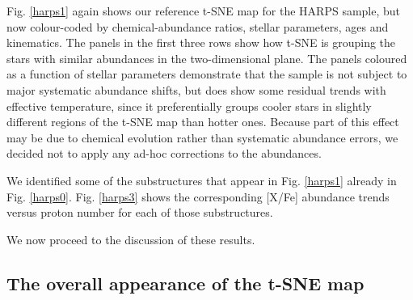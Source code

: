 \documentclass{aa}  %
\begin{document}
Fig. \ref{harps1} again shows our reference t-SNE map for the HARPS sample, but now colour-coded by chemical-abundance ratios, stellar parameters, ages and kinematics. The panels in the first three rows show how t-SNE is grouping the stars with similar abundances in the two-dimensional plane. The panels coloured as a function of stellar parameters demonstrate that the sample is not subject to major systematic abundance shifts, but does show some residual trends with effective temperature, since it preferentially groups cooler stars in slightly different regions of the t-SNE map than hotter ones. Because part of this effect may be due to chemical evolution rather than systematic abundance errors, we decided not to apply any ad-hoc corrections to the abundances. 

We identified some of the substructures that appear in Fig. \ref{harps1} already in Fig. \ref{harps0}. Fig. \ref{harps3} shows the corresponding [X/Fe] abundance trends versus proton number for each of those substructures.

We now proceed to the discussion of these results.

\subsection{The overall appearance of the t-SNE map}
\end{document}
